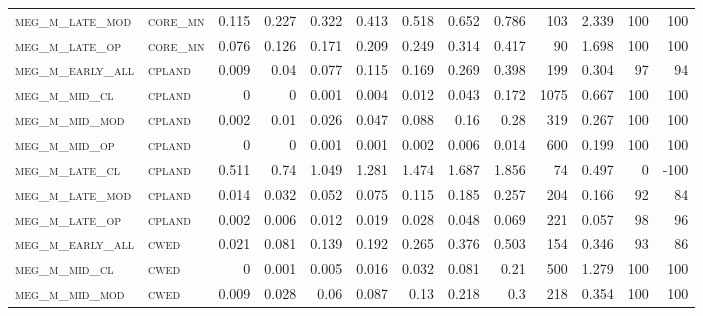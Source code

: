 \begin{landscape}
\begin{center}
\begin{footnotesize}
\begin{longtable}{llrrrrrrrr|rrr}
\textsc{meg\_m\_late\_mod } & \textsc{core\_mn  }   & 0.115    & 0.227    & 0.322    & 0.413    & 0.518    & 0.652    & 0.786     & 103    & 2.339         & 100           & 100             \\
\textsc{meg\_m\_late\_op  } & \textsc{core\_mn  }   & 0.076    & 0.126    & 0.171    & 0.209    & 0.249    & 0.314    & 0.417     & 90     & 1.698         & 100           & 100             \\
\textsc{meg\_m\_early\_all} & \textsc{cpland    }   & 0.009    & 0.04     & 0.077    & 0.115    & 0.169    & 0.269    & 0.398     & 199    & 0.304         & 97            & 94              \\
\textsc{meg\_m\_mid\_cl   } & \textsc{cpland    }   & 0        & 0        & 0.001    & 0.004    & 0.012    & 0.043    & 0.172     & 1075   & 0.667         & 100           & 100             \\
\textsc{meg\_m\_mid\_mod  } & \textsc{cpland    }   & 0.002    & 0.01     & 0.026    & 0.047    & 0.088    & 0.16     & 0.28      & 319    & 0.267         & 100           & 100             \\
\textsc{meg\_m\_mid\_op   } & \textsc{cpland    }   & 0        & 0        & 0.001    & 0.001    & 0.002    & 0.006    & 0.014     & 600    & 0.199         & 100           & 100             \\
\textsc{meg\_m\_late\_cl  } & \textsc{cpland    }   & 0.511    & 0.74     & 1.049    & 1.281    & 1.474    & 1.687    & 1.856     & 74     & 0.497         & 0             & -100            \\
\textsc{meg\_m\_late\_mod } & \textsc{cpland    }   & 0.014    & 0.032    & 0.052    & 0.075    & 0.115    & 0.185    & 0.257     & 204    & 0.166         & 92            & 84              \\
\textsc{meg\_m\_late\_op  } & \textsc{cpland    }   & 0.002    & 0.006    & 0.012    & 0.019    & 0.028    & 0.048    & 0.069     & 221    & 0.057         & 98            & 96              \\
\textsc{meg\_m\_early\_all} & \textsc{cwed      }   & 0.021    & 0.081    & 0.139    & 0.192    & 0.265    & 0.376    & 0.503     & 154    & 0.346         & 93            & 86              \\
\textsc{meg\_m\_mid\_cl   } & \textsc{cwed      }   & 0        & 0.001    & 0.005    & 0.016    & 0.032    & 0.081    & 0.21      & 500    & 1.279         & 100           & 100             \\
\textsc{meg\_m\_mid\_mod  } & \textsc{cwed      }   & 0.009    & 0.028    & 0.06     & 0.087    & 0.13     & 0.218    & 0.3       & 218    & 0.354         & 100           & 100             \\

\end{longtable}
\end{footnotesize}
\end{center}
\end{landscape}
